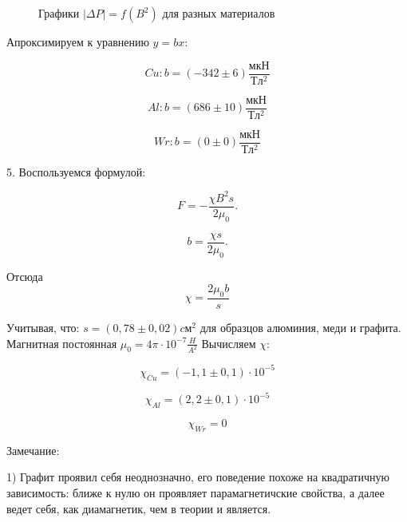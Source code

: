 \documentclass[11pt]{article}
\begin{document}
\begin{figure}[H]
\caption{Графики $ |\Delta P| = f(B^2) $ для разных материалов}
\label{pic:3}
\end{figure}

Апроксимируем к уравнению $y = bx$:

\[Cu: b = (-342 \pm 6) \frac{мкН}{Тл^2}\]

\[Al: b = (686 \pm 10) \frac{мкН}{Тл^2}\]

\[Wr: b = (0 \pm 0) \frac{мкН}{Тл^2}\]

5. Воспользуемся формулой:

\begin{equation*}\label{5}
F = -\frac{\chi B^2s}{2\mu_0}.
\end{equation*}

\begin{equation}\label{6}
b = \frac{\chi s}{2\mu_0}.
\end{equation}

Отсюда
\begin{equation}\label{7}
\boxed{\chi = \frac{2\mu_0 b}{s}}
\end{equation}

Учитывая, что:
$ s = (0,78 \pm 0,02) cм^2$ для образцов алюминия, меди и графита. Магнитная постоянная $\mu_0 = 4 \pi \cdot 10^{-7} \frac{H}{A^2}$ Вычисляем $\chi$:

\[\chi_{Cu} = (-1,1 \pm 0,1)\cdot 10^{-5} \]

\[\chi_{Al} = (2,2 \pm 0,1)\cdot 10^{-5} \]

\[\chi_{Wr} = 0\]

Замечание: 

1) Графит проявил себя неоднозначно, его поведение похоже на квадратичную зависимость: ближе к нулю он проявляет парамагнетичские свойства, а далее ведет себя, как диамагнетик, чем в теории и является.
\end{document}
